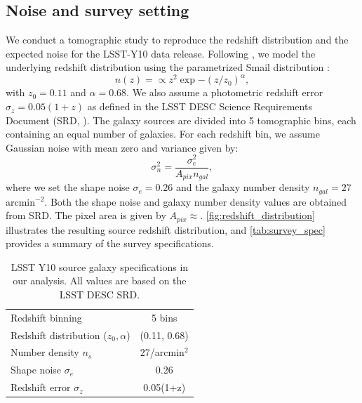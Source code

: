 \documentclass{aa}
\begin{document}
\subsection{Noise and survey setting}
We conduct a tomographic study to reproduce the redshift distribution and the expected noise for the LSST-Y10 data release.
Following \citet{zhang2022transitioning}, we model the underlying redshift distribution using the parametrized Smail distribution \citep{smail1995deep}:
\begin{equation}
    n(z)=\propto z^2 \exp{-(z/z_0)^{\alpha}},
\end{equation}
with $z_0=0.11$ and $\alpha=0.68$. We also assume a photometric redshift error $\sigma_z=0.05(1+z)$ as defined in the LSST DESC Science Requirements Document (SRD, \citet{mandelbaum2018lsst}).
The galaxy sources are divided into 5 tomographic bins, each containing an equal number of galaxies. 
For each redshift bin, we assume Gaussian noise with mean zero and variance given by:
 \begin{equation}
     \sigma^2_n= \frac{\sigma_e^2}{A_{pix}n_{gal}},
 \end{equation}
where we set the shape noise $\sigma_e = 0.26$ and the galaxy number density $n_{gal}=27$ arcmin$^{-2}$. Both the shape noise and galaxy number density values are obtained from SRD. The pixel area is given by $A_{pix}\approx$. 
\autoref{fig:redshift_distribution} illustrates the resulting source redshift distribution, and \autoref{tab:survey_spec} provides a summary of the survey specifications.
\begin{table}
	\begin{center}
    	\begin{tabular}{lc} 
            \hline \hline
    		Redshift binning & 5 bins \\
    		Redshift distribution ($z_{0}, \alpha$) & (0.11, 0.68)  \\
    		Number density $n_s$ & 27/arcmin$^2$ \\
    		Shape noise $\sigma_e$ & 0.26 \\
    		Redshift error $\sigma_z$ &0.05(1+z)  \\
    		\hline
    	\end{tabular}
     	\caption{ LSST Y10 source galaxy specifications in our analysis. All values are based on the LSST DESC SRD.}
	    \label{tab:survey_spec}
    \end{center}
\end{table}
\end{document}
